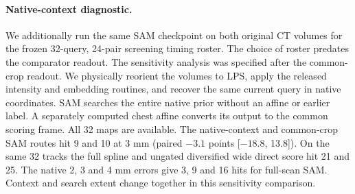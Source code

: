 \paragraph{Native-context diagnostic.}
We additionally run the same SAM checkpoint on both original CT volumes for the frozen 32-query, 24-pair screening timing roster. The choice of roster predates the comparator readout. The sensitivity analysis was specified after the common-crop readout. We physically reorient the volumes to LPS, apply the released intensity and embedding routines, and recover the same current query in native coordinates. SAM searches the entire native prior without an affine or earlier label. A separately computed chest affine converts its output to the common scoring frame. All 32 maps are available. The native-context and common-crop SAM routes hit 9 and 10 at 3 mm (paired $-3.1$ points [$-18.8$, 13.8]). On the same 32 tracks the full spline and ungated diversified wide direct score hit 21 and 25. The native 2, 3 and 4 mm errors give 3, 9 and 16 hits for full-scan SAM. Context and search extent change together in this sensitivity comparison.

